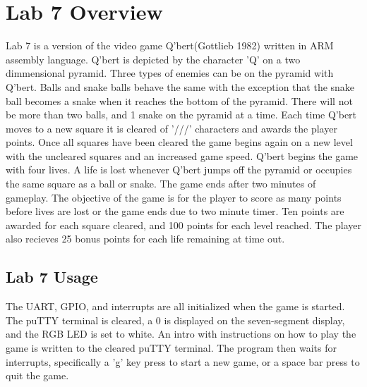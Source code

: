
\usepackage{tikz}
\usetikzlibrary{fit,arrows,calc,positioning}




  \tableofcontents\newpage


\section{Lab 7 Overview}
  Lab 7 is a version of the video game Q'bert(Gottlieb 1982) written in ARM
  assembly language. Q'bert is depicted by the character 'Q' on a two 
  dimmensional pyramid. Three types of enemies can be on the pyramid with
  Q'bert. Balls and snake balls behave the same with the exception that the 
  snake ball becomes a snake when it reaches the bottom of the pyramid. There
  will not be more than two balls, and 1 snake on the pyramid at a time. Each
  time Q'bert moves to a new square it is cleared of '///' characters and awards
  the player points. Once all squares have been cleared the game begins again on
  a new level with the uncleared squares and an increased game speed. Q'bert
  begins the game with four lives. A life is lost whenever Q'bert jumps off the
  pyramid or occupies the same square as a ball or snake. The game ends after two
  minutes of gameplay. The objective of the game is for the player to score as
  many points before lives are lost or the game ends due to two minute timer.
  Ten points are awarded for each square cleared, and 100 points for each level
  reached. The player also recieves 25 bonus points for each life remaining at
  time out.
  \subsection{Lab 7 Usage}
   The UART, GPIO, and interrupts are all initialized when the game is started.
   The puTTY terminal is cleared, a 0 is displayed on the seven-segment display,
   and the RGB LED is set to white. An intro with instructions on how to play 
   the game is written to the cleared puTTY terminal. The program then waits for 
   interrupts, specifically a 'g' key press to start a new game, or a space bar 
   press to quit the game. 
